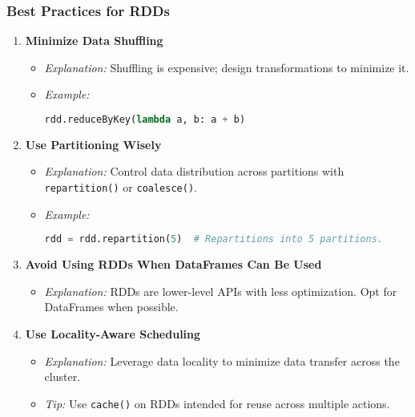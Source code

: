 \documentclass[aspectratio=169]{beamer}
\begin{document}
\begin{frame}[fragile]
    \frametitle{Best Practices for RDDs}
    \begin{enumerate}
        \item \textbf{Minimize Data Shuffling}
        \begin{itemize}
            \item \textit{Explanation:} Shuffling is expensive; design transformations to minimize it.
            \item \textit{Example:}\\
            \begin{lstlisting}[language=Python]
rdd.reduceByKey(lambda a, b: a + b)   
            \end{lstlisting}
        \end{itemize}

        \item \textbf{Use Partitioning Wisely}
        \begin{itemize}
            \item \textit{Explanation:} Control data distribution across partitions with \texttt{repartition()} or \texttt{coalesce()}.
            \item \textit{Example:}\\
            \begin{lstlisting}[language=Python]
rdd = rdd.repartition(5)  # Repartitions into 5 partitions.
            \end{lstlisting}
        \end{itemize}

        \item \textbf{Avoid Using RDDs When DataFrames Can Be Used}
        \begin{itemize}
            \item \textit{Explanation:} RDDs are lower-level APIs with less optimization. Opt for DataFrames when possible.
        \end{itemize}

        \item \textbf{Use Locality-Aware Scheduling}
        \begin{itemize}
            \item \textit{Explanation:} Leverage data locality to minimize data transfer across the cluster.
            \item \textit{Tip:} Use \texttt{cache()} on RDDs intended for reuse across multiple actions.
        \end{itemize}
    \end{enumerate}
\end{frame}
\end{document}

